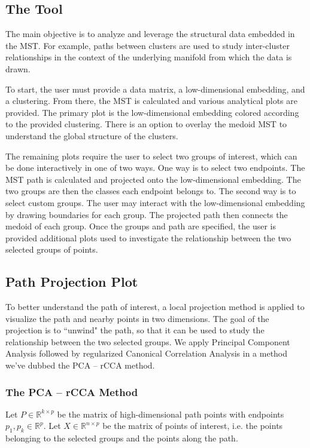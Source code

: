 \documentclass{article}
\begin{document}
{\subsection{The Tool}
The main objective is to analyze and leverage the structural data embedded in the MST. For example, paths between clusters are used to study inter-cluster relationships in the context of the underlying manifold from which the data is drawn.

To start, the user must provide a data matrix, a low-dimensional embedding, and a clustering. From there, the MST is calculated and various analytical plots are provided. The primary plot is the low-dimensional embedding colored according to the provided clustering. There is an option to overlay the medoid MST to understand the global structure of the clusters.

The remaining plots require the user to select two groups of interest, which can be done interactively in one of two ways. One way is to select two endpoints. The MST path is calculated and projected onto the low-dimensional embedding. The two groups are then the classes each endpoint belongs to. The second way is to select custom groups. The user may interact with the low-dimensional embedding by drawing boundaries for each group. The projected path then connects the medoid of each group. Once the groups and path are specified, the user is provided additional plots used to investigate the relationship between the two selected groups of points.

\subsection{Path Projection Plot}
To better understand the path of interest, a local projection method is applied to visualize the path and nearby points in two dimensions. The goal of the projection is to ``unwind" the path, so that it can be used to study the relationship between the two selected groups. We apply Principal Component Analysis followed by regularized Canonical Correlation Analysis in a method we've dubbed the PCA -- rCCA method.

\subsubsection{The PCA -- rCCA Method}
Let $P \in \mathbb{R}^{k \times p}$ be the matrix of high-dimensional path points with endpoints $p_1, p_k \in \mathbb{R}^p$. Let $X \in \mathbb{R}^{n \times p}$ be the matrix of points of interest, i.e. the points belonging to the selected groups and the points along the path.

}
\end{document}
